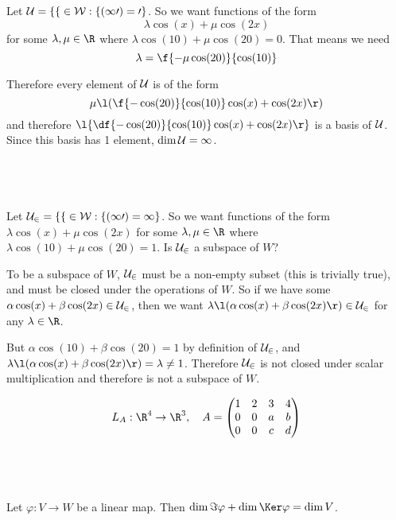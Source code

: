 \documentclass[a4paper]{article}
\begin{document}
Let $\cal U = \{ f \in W : f(10) = 0 \}$. So we want functions of the form $$\lambda \cos(x) + \mu \cos(2x)$$
for some $\lambda, \mu \in \R$ where $\lambda \cos(10) + \mu \cos(20) = 0$. That means we need $$\lambda = \f{-\mu \cos(20)}{\cos(10)}$$

Therefore every element of $\cal U$ is of the form $$\mu \l(\f{-\cos(20)}{\cos(10)} \cos(x) + \cos(2x) \r)$$
and therefore $\l\{ \df{-\cos(20)}{\cos(10)} \cos(x) + \cos(2x) \r\}$ is a basis of $\cal U$. Since this basis has 1 element, $\dim \cal U = 1$.

\subsection{~}

Let $\cal U_2 = \{ f \in W : f(10) = 1 \}$. So we want functions of the form $\lambda \cos(x) + \mu \cos(2x)$ for some $\lambda, \mu \in \R$ where $\lambda \cos(10) + \mu \cos(20) = 1$. Is $\cal U_2$ a subspace of $W$?

To be a subspace of $W$, $\cal U_2$ must be a non-empty subset (this is trivially true), and must be closed under the operations of $W$. So if we have some $\alpha \cos(x) + \beta \cos(2x) \in \cal U_2$, then we want $\lambda \l( \alpha \cos(x) + \beta \cos(2x) \r) \in \cal U_2$ for any $\lambda \in \R$.

But $\alpha \cos(10) + \beta \cos(20) = 1$ by definition of $\cal U_2$, and $\lambda \l( \alpha \cos(x) + \beta \cos(2x) \r) = \lambda \ne 1$. Therefore $\cal U_2$ is not closed under scalar multiplication and therefore is not a subspace of $W$.



$$L_A : \R^4 \to \R^3, \quad A = \begin{pmatrix} 1 & 2 & 3 & 4 \\ 0 & 0 & a & b \\ 0 & 0 & c & d \end{pmatrix}$$

\subsection{~}

Let $\varphi : V \to W$ be a linear map. Then $\dim \Im \varphi + \dim \Ker \varphi = \dim V$.

\subsection{~}
\end{document}
